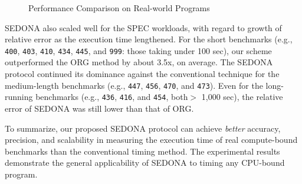 \documentclass[letter]{ieice}
\begin{document}
\begin{figure}[t]
{		\label{fig:matc_std}
	}
	\vspace{-.1in}
	\caption{{\color{blue}Performance Comparison on Real-world Programs~\label{fig:synprog_test}}}
\vspace{-.2in}
\end{figure}

SEDONA also scaled well for the SPEC workloads, 
with regard to growth of relative error as the execution time lengthened.
For the short benchmarks 
(e.g., {\tt 400}, {\tt 403}, {\tt 410}, 
{\tt 434}, {\tt 445}, and {\tt 999}: those taking \hbox{under} 100 sec), 
our scheme outperformed the ORG method by about 3.5x, on average. 
The SEDONA protocol continued its dominance against the conventional technique 
for the medium-length benchmarks (e.g., {\tt 447}, {\tt 456}, {\tt 470}, and {\tt 473}).
{\color{blue}Even for the long-running benchmarks (e.g., {\tt 436}, {\tt 416}, and {\tt 454}, both$>$ 1,000 sec), 
the relative error of \hbox{SEDONA} was still lower than that of ORG.}

To summarize, our proposed SEDONA protocol can achieve {\em better} accuracy,
precision, and scalability in measuring the execution time of real \hbox{compute-bound} benchmarks than the conventional timing method. 
{\color{blue}The experimental results demonstrate 
the general applicability of SEDONA to timing any CPU-bound program.}
\end{document}
